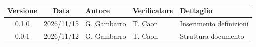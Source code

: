\\[0.5cm]

\renewcommand{\arraystretch}{1.3}
\noindent\begin{tabularx}{\textwidth}{|c|c|>{\raggedright\arraybackslash}p{2.8cm}|>{\raggedright\arraybackslash}p{2.8cm}|X|}
    \hline
    \textbf{Versione} & \textbf{Data} & \textbf{Autore} & \textbf{Verificatore} & \textbf{Dettaglio} \\
    \hline
    0.1.0 & 2026/11/15 & G. Gambarro & T. Caon & Inserimento definizioni \\
    \hline
    0.0.1 & 2026/11/12 & G. Gambarro & T. Caon & Struttura documento \\
    \hline
\end{tabularx}
\newpage
